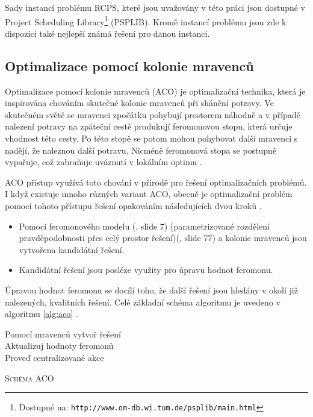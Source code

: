 \documentclass[a4paper,12pt]{article}
\begin{document}
Sady instancí problému RCPS, které jsou uvažovány v této práci jsou dostupné v Project Scheduling Library\footnote{Dostupné na: \texttt{http://www.om-db.wi.tum.de/psplib/main.html}} (PSPLIB). 
Kromě instancí problému jsou zde k dispozici také nejlepší známá řešení pro danou instanci. 

\subsection{Optimalizace pomocí kolonie mravenců}
Optimalizace pomocí kolonie mravenců (ACO) je optimalizační technika, která je inspirována chováním skutečné kolonie mravenců při
shánění potravy. Ve skutečném světě se mravenci zpočátku pohybují prostorem náhodně a v případě nalezení potravy
na zpáteční cestě produkují feromonovou stopu, která určuje vhodnost této cesty. Po této stopě se potom mohou pohybovat další 
mravenci s nadějí, že naleznou další potravu. Nicméně feromonová stopa se postupně vypařuje, což zabraňuje uváznutí v
lokálním optimu \cite{Blum2005353}.

ACO přístup využívá toto chování v přírodě pro řešení optimalizačních problémů. I když existuje mnoho různých variant ACO,
obecně je optimalizační problém pomocí tohoto přístupu řešení opakováním následujících dvou kroků \cite{Blum2005353}.
\begin{itemize}
 \item Pomocí feromonového modelu (\cite{peringer}, slide 7) (parametrizované rozdělení pravděpodobnosti přes celý prostor řešení)(\cite{peringer}, slide 77) a kolonie mravenců jsou
  vytvořena kandidátní řešení.
 \item Kandidátní řešení jsou posléze využity pro úpravu hodnot feromonu.
\end{itemize}
Úpravou hodnot feromonu se docílí toho, že další řešení jsou hledány v okolí již nalezených, kvalitních řešení.
Celé základní schéma algoritmu je uvedeno v algoritmu \ref{alg:aco} \cite{Blum2005353}.

\medskip
\begin{algorithm}[H]
 \SetNlSty{}{}{:}
 \SetNlSkip{-1.2em}
 \SetInd{1em}{1em}
 \BlankLine
 \Indentp{1.7em}
      {
	Pomocí mravenců vytvoř řešení \\
	Aktualizuj hodnoty feromonů \\
	Proveď centralizované akce \\
     }
 \caption{\textsc{Schéma ACO}}
 \label{alg:aco}
\end{algorithm}
\end{document}
